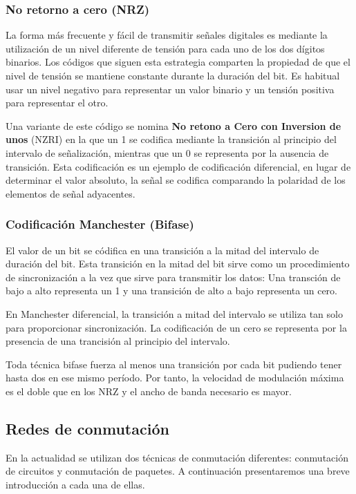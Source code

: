 \subsubsection*{No retorno a cero (NRZ)}
La forma más frecuente y fácil de transmitir señales digitales es mediante la utilización de un nivel diferente de tensión para cada uno de los dos dígitos binarios. Los códigos que siguen esta estrategia comparten la propiedad de que el nivel de tensión se mantiene constante durante la duración del bit. Es habitual usar un nivel negativo para representar un valor binario y un tensión positiva para representar el otro.

Una variante de este código se nomina \textbf{No retono a Cero con Inversion de unos} (NZRI) en la que un 1 se codifica mediante la transición al principio del intervalo de señalización, mientras que un 0 se representa por la ausencia de transición. Esta codificación es un ejemplo de codificación diferencial, en lugar de determinar el valor absoluto, la señal se codifica comparando la polaridad de los elementos de señal adyacentes.

\subsubsection*{Codificación Manchester (Bifase)}
El valor de un bit se códifica en una transición a la mitad del intervalo de duración del bit. Esta transición en la mitad del bit sirve como un procedimiento de sincronización a la vez que sirve para transmitir los datos: Una transción de bajo a alto representa un 1 y una transición de alto a bajo representa un cero.

En Manchester diferencial, la transición a mitad del intervalo se utiliza tan solo para proporcionar sincronización. La codificación de un cero se representa por la presencia de una trancisión al principio del intervalo. 

Toda técnica bifase fuerza al menos una transición por cada bit pudiendo tener hasta dos en ese mismo período. Por tanto, la velocidad de modulación máxima es el doble que en los NRZ y el ancho de banda necesario es mayor.

\subsection{Redes de conmutación}
En la actualidad se utilizan dos técnicas de conmutación diferentes: conmutación de circuitos y conmutación de paquetes. A continuación presentaremos una breve introducción a cada una de ellas.

